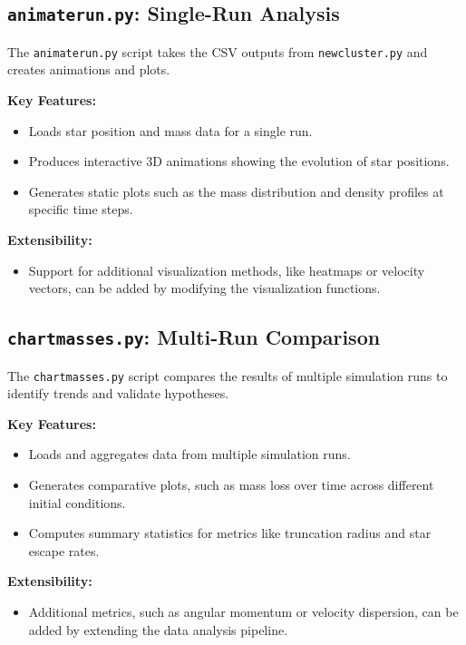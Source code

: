 \documentclass[10pt,twocolumn]{article}
\begin{document}
\subsection{\texttt{animaterun.py}: Single-Run Analysis}
The \texttt{animaterun.py} script takes the CSV outputs from \texttt{newcluster.py} and creates animations and plots. 

\textbf{Key Features:}
\begin{itemize}
    \item Loads star position and mass data for a single run.
    \item Produces interactive 3D animations showing the evolution of star positions.
    \item Generates static plots such as the mass distribution and density profiles at specific time steps.
\end{itemize}

\textbf{Extensibility:}
\begin{itemize}
    \item Support for additional visualization methods, like heatmaps or velocity vectors, can be added by modifying the visualization functions.
\end{itemize}

\subsection{\texttt{chartmasses.py}: Multi-Run Comparison}
The \texttt{chartmasses.py} script compares the results of multiple simulation runs to identify trends and validate hypotheses. 

\textbf{Key Features:}
\begin{itemize}
    \item Loads and aggregates data from multiple simulation runs.
    \item Generates comparative plots, such as mass loss over time across different initial conditions.
    \item Computes summary statistics for metrics like truncation radius and star escape rates.
\end{itemize}

\textbf{Extensibility:}
\begin{itemize}
    \item Additional metrics, such as angular momentum or velocity dispersion, can be added by extending the data analysis pipeline.
\end{itemize}
\end{document}
